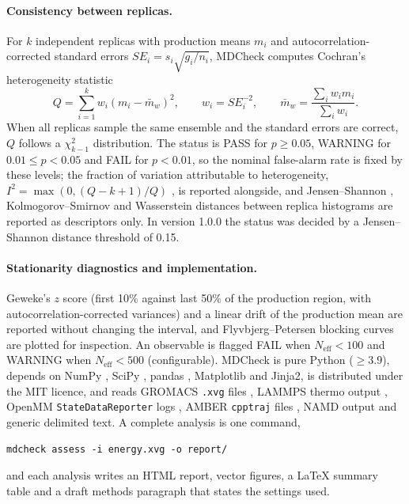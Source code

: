 \documentclass[9pt,lessons]{livecoms}
\begin{document}
\paragraph{Consistency between replicas.}
For $k$ independent replicas with production means $m_i$ and autocorrelation-corrected standard errors $SE_i = s_i\sqrt{g_i/n_i}$, MDCheck computes Cochran's heterogeneity statistic \cite{cochran1954}
\begin{equation}
Q = \sum_{i=1}^{k} w_i (m_i - \bar{m}_w)^2,\qquad w_i = SE_i^{-2},\qquad \bar{m}_w = \frac{\sum_i w_i m_i}{\sum_i w_i}.
\end{equation}
When all replicas sample the same ensemble and the standard errors are correct, $Q$ follows a $\chi^2_{k-1}$ distribution. The status is PASS for $p \ge 0.05$, WARNING for $0.01 \le p < 0.05$ and FAIL for $p < 0.01$, so the nominal false-alarm rate is fixed by these levels; the fraction of variation attributable to heterogeneity, $I^2 = \max(0, (Q-k+1)/Q)$ \cite{higgins2002}, is reported alongside, and Jensen--Shannon \cite{lin1991}, Kolmogorov--Smirnov and Wasserstein distances between replica histograms are reported as descriptors only. In version 1.0.0 the status was decided by a Jensen--Shannon distance threshold of 0.15.

\paragraph{Stationarity diagnostics and implementation.}
Geweke's $z$ score \cite{geweke1992} (first 10\% against last 50\% of the production region, with autocorrelation-corrected variances) and a linear drift of the production mean are reported without changing the interval, and Flyvbjerg--Petersen blocking curves \cite{flyvbjerg1989error} are plotted for inspection. An observable is flagged FAIL when $N_{\mathrm{eff}} < 100$ and WARNING when $N_{\mathrm{eff}} < 500$ (configurable). MDCheck is pure Python ($\ge 3.9$), depends on NumPy \cite{harris2020}, SciPy \cite{virtanen2020}, pandas \cite{mckinney2010}, Matplotlib \cite{hunter2007} and Jinja2, is distributed under the MIT licence, and reads GROMACS \texttt{.xvg} files \cite{abraham2015}, LAMMPS thermo output \cite{thompson2022}, OpenMM \texttt{StateDataReporter} logs \cite{eastman2024openmm}, AMBER \texttt{cpptraj} files \cite{case2005}, NAMD output \cite{phillips2020} and generic delimited text. A complete analysis is one command,
\begin{lstlisting}
mdcheck assess -i energy.xvg -o report/
\end{lstlisting}
and each analysis writes an HTML report, vector figures, a \LaTeX{} summary table and a draft methods paragraph that states the settings used.
\end{document}
